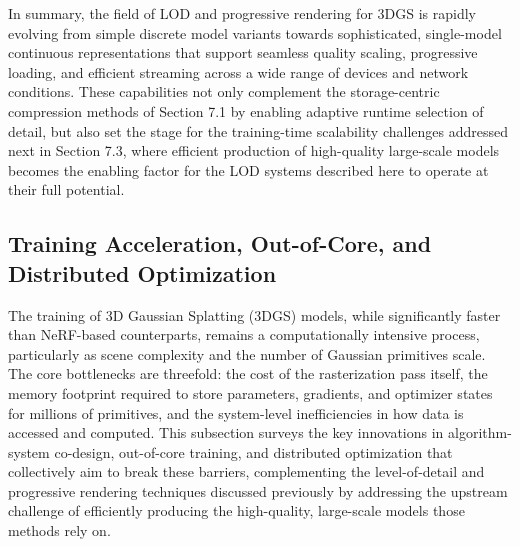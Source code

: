 \documentclass[11pt]{article}
\begin{document}
In summary, the field of LOD and progressive rendering for 3DGS is rapidly evolving from simple discrete model variants towards sophisticated, single-model continuous representations that support seamless quality scaling, progressive loading, and efficient streaming across a wide range of devices and network conditions. These capabilities not only complement the storage-centric compression methods of Section 7.1 by enabling adaptive runtime selection of detail, but also set the stage for the training-time scalability challenges addressed next in Section 7.3, where efficient production of high-quality large-scale models becomes the enabling factor for the LOD systems described here to operate at their full potential.

\subsection{Training Acceleration, Out-of-Core, and Distributed Optimization}

The training of 3D Gaussian Splatting (3DGS) models, while significantly faster than NeRF-based counterparts, remains a computationally intensive process, particularly as scene complexity and the number of Gaussian primitives scale. The core bottlenecks are threefold: the cost of the rasterization pass itself, the memory footprint required to store parameters, gradients, and optimizer states for millions of primitives, and the system-level inefficiencies in how data is accessed and computed. This subsection surveys the key innovations in algorithm-system co-design, out-of-core training, and distributed optimization that collectively aim to break these barriers, complementing the level-of-detail and progressive rendering techniques discussed previously by addressing the upstream challenge of efficiently producing the high-quality, large-scale models those methods rely on.
\end{document}
